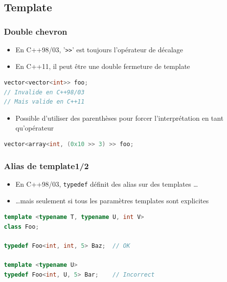 \documentclass[C++.tex]{subfiles}
\begin{document}
\subsection*{Template}
\begin{frame}[fragile]
	\frametitle{Double chevron}
	\begin{itemize}
		\item En C++98/03, '\lstinline|>>|' est toujours l'opérateur de décalage
		\item En C++11, il peut être une double fermeture de template
	\end{itemize}

	\begin{lstlisting}[language=C++]
vector<vector<int>> foo;
// Invalide en C++98/03
// Mais valide en C++11\end{lstlisting}


	\begin{itemize}
		\item Possible d'utiliser des parenthèses pour forcer l'interprétation en tant qu'opérateur
	\end{itemize}

	\begin{lstlisting}[language=C++]
vector<array<int, (0x10 >> 3) >> foo;\end{lstlisting}
\end{frame}

\begin{frame}[fragile]
	\frametitle{Alias de template\titlehfill{}1/2}
	\begin{itemize}
		\item En C++98/03, \lstinline|typedef| définit des alias sur des templates \ldots
		\item \ldots mais seulement si tous les paramètres templates sont explicites
	\end{itemize}

	\begin{lstlisting}[language=C++]
template <typename T, typename U, int V>
class Foo;

typedef Foo<int, int, 5> Baz;  // OK

template <typename U>
typedef Foo<int, U, 5> Bar;    // Incorrect\end{lstlisting}
\end{frame}
\end{document}
